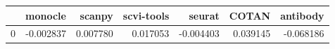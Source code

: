 \begin{tabular}{lrrrrrr}
\toprule
 & monocle & scanpy & scvi-tools & seurat & COTAN & antibody \\
\midrule
0 & -0.002837 & 0.007780 & 0.017053 & -0.004403 & 0.039145 & -0.068186 \\
\bottomrule
\end{tabular}
